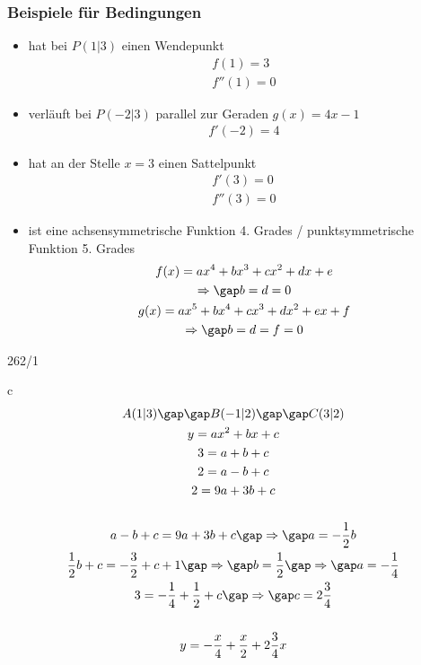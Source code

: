 \subsubsection{Beispiele für Bedingungen}
\begin{itemize}
  \item hat bei $P(1|3)$ einen Wendepunkt
  \begin{gather*}
    f(1) = 3 \\
    f''(1) = 0
  \end{gather*}
  \item verläuft bei $P(-2|3)$ parallel zur Geraden $g(x) = 4x - 1$
  \begin{gather*}
    f'(-2) = 4
  \end{gather*}
  \item hat an der Stelle $x = 3$ einen Sattelpunkt
  \begin{gather*}
    f'(3) = 0 \\
    f''(3) = 0
  \end{gather*}
  \item ist eine achsensymmetrische Funktion 4. Grades / punktsymmetrische Funktion 5. Grades
  \begin{gather*}
    f(x) = ax^4 + bx^3 + cx^2 + dx + e \\
    \Rightarrow\gap b = d = 0 \\
    g(x) = ax^5 + bx^4 + cx^3 + dx^2 + ex + f \\
    \Rightarrow\gap b = d = f = 0
  \end{gather*}
\end{itemize}
\begin{exercise}{262/1}
  \item [c]
  \begin{gather*}
    A(1|3) \gap\gap B(-1|2) \gap\gap C(3|2) \\
    y = ax^2 + bx + c \\
    3 = a + b + c \\
    2 = a - b + c \\
    2 = 9a + 3b + c \\\\
    a - b + c = 9a + 3b + c \gap\Rightarrow\gap a = -\frac{1}{2}b \\
    \frac{1}{2}b + c = -\frac{3}{2} + c + 1 \gap\Rightarrow\gap b = \frac{1}{2} \gap\Rightarrow\gap a = -\frac{1}{4} \\
    3 = -\frac{1}{4} + \frac{1}{2} + c \gap\Rightarrow\gap c = 2\frac{3}{4} \\\\
    y = -\frac{x}{4} + \frac{x}{2} + 2\frac{3}{4}x
  \end{gather*}
\end{exercise}
